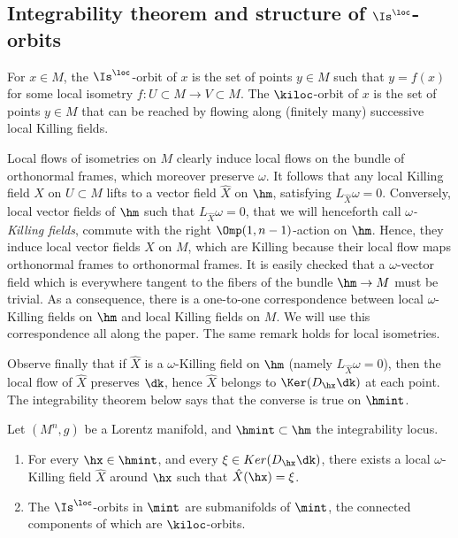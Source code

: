 \subsection{Integrability theorem and structure of \texorpdfstring{$\Is^{\loc}$}{Isloc}-orbits}
\label{sec.integration}


For $x \in M$, the $\Is^{\loc}$-orbit of $x$ is the set of points $y \in M$ such that $y=f(x)$ for some local isometry $f:U\subset M \to V \subset M$. The $\kiloc$-orbit of $x$ is the set of points $y \in M$ that can be reached by flowing along (finitely many) successive local Killing fields.

Local flows of isometries on $M$ clearly induce local flows on the bundle of orthonormal frames, which moreover preserve $\omega$. It follows that any local Killing field $X$ on $U \subset M$ lifts to a vector field $\hat{X}$ on $\hm$, satisfying $L_{\hat{X}}\omega=0$. Conversely, local vector fields of $\hm$ such that $L_{\hat{X}}\omega=0$, that we will henceforth call \emph{$\omega$-Killing fields}, commute with the right $\Omp(1,n-1)$-action on $\hm$. Hence, they induce local vector fields $X$ on $M$, which are Killing because their local flow maps orthonormal frames to orthonormal frames. It is easily checked that a $\omega$-vector field which is everywhere tangent to the fibers of the bundle $\hm \to M$ must be trivial. As a consequence, there is a one-to-one correspondence between local $\omega$-Killing fields on $\hm$ and local Killing fields on $M$. We will use this correspondence all along the paper. The same remark holds for local isometries.


Observe finally that if $\hat{X}$ is a $\omega$-Killing field on $\hm$ (namely $L_{\hat{X}} \omega=0$), then the local flow of $\hat{X}$ preserves $\dk$, hence $\hat{X}$ belongs to $\Ker(D_{\hx}\dk)$ at each point. The integrability theorem below says that the converse is true on $\hmint$.


\begin{theo}\label{thm.integrabilite}
Let $(M^n,g)$ be a Lorentz manifold, and $\hmint \subset \hm$ the integrability locus.
\begin{enumerate}
\item \label{list3.1.1}For every $\hx \in \hmint$, and every $\xi \in Ker(D_{\hx}\dk)$, there exists a local $\omega$-Killing field $\hat{X}$ around $\hx$ such that $\hat{X}(\hx)=\xi$.
\item \label{list3.1.2}The $\Is^{\loc}$-orbits in $\mint$ are submanifolds of $\mint$, the connected components of which are $\kiloc$-orbits.
\end{enumerate}
\end{theo}


